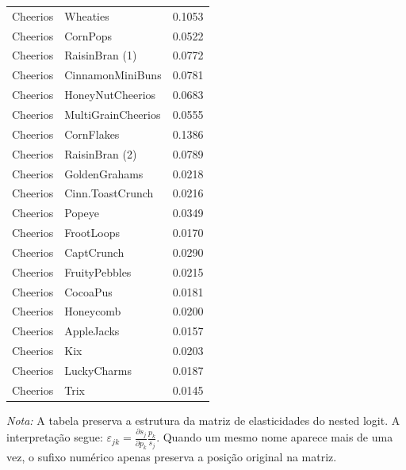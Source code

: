\begin{table}[H]
\begin{tabular}{llr}
Cheerios & Wheaties & 0.1053 \\
Cheerios & CornPops & 0.0522 \\
Cheerios & RaisinBran (1) & 0.0772 \\
Cheerios & CinnamonMiniBuns & 0.0781 \\
Cheerios & HoneyNutCheerios & 0.0683 \\
Cheerios & MultiGrainCheerios & 0.0555 \\
Cheerios & CornFlakes & 0.1386 \\
Cheerios & RaisinBran (2) & 0.0789 \\
Cheerios & GoldenGrahams & 0.0218 \\
Cheerios & Cinn.ToastCrunch & 0.0216 \\
Cheerios & Popeye & 0.0349 \\
Cheerios & FrootLoops & 0.0170 \\
Cheerios & CaptCrunch & 0.0290 \\
Cheerios & FruityPebbles & 0.0215 \\
Cheerios & CocoaPus & 0.0181 \\
Cheerios & Honeycomb & 0.0200 \\
Cheerios & AppleJacks & 0.0157 \\
Cheerios & Kix & 0.0203 \\
Cheerios & LuckyCharms & 0.0187 \\
Cheerios & Trix & 0.0145 \\
\bottomrule
\end{tabular}

\vspace{0.3em}
\footnotesize
\textit{Nota:} A tabela preserva a estrutura da matriz de elasticidades do nested logit. A interpretação segue: $\varepsilon_{jk}=\frac{\partial s_j}{\partial p_k}\frac{p_k}{s_j}$. Quando um mesmo nome aparece mais de uma vez, o sufixo numérico apenas preserva a posição original na matriz.
\end{table}
\endgroup


